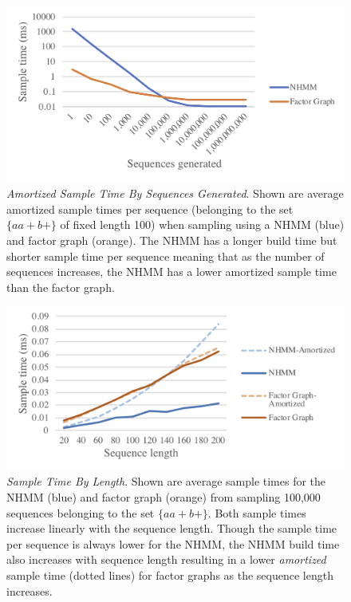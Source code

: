 \documentclass[phd,electronic,oneside,twosidetoc,letterpaper,chaptercenter,parttop,lol,lof,lot]{byumsphd}
\begin{document}
\begin{figure}
    \centering
    \includegraphics[width=\linewidth]{sampleTimeByCountlegend}
    \caption{\textit{Amortized Sample Time By Sequences Generated}. Shown are average amortized sample times per sequence (belonging to the set $\{aa+b+\}$ of fixed length 100) when sampling using a NHMM (blue) and factor graph (orange). The NHMM has a longer build time but shorter sample time per sequence meaning that as the number of sequences increases, the NHMM has a lower amortized sample time than the factor graph.}
    \label{fig:sampleTimeByCount}
\end{figure}

\begin{figure}
    \centering
    \includegraphics[width=\linewidth]{sampleTimeByLengthlegend}
    \caption{\textit{Sample Time By Length}. Shown are average sample times for the NHMM (blue) and factor graph (orange) from sampling 100,000 sequences belonging to the set $\{aa+b+\}$. Both sample times increase linearly with the sequence length. Though the sample time per sequence is always lower for the NHMM, the NHMM build time also increases with sequence length resulting in a lower \emph{amortized} sample time (dotted lines) for factor graphs as the sequence length increases.}
    \label{fig:sampleTimeByLength}
\end{figure}
\end{document}
